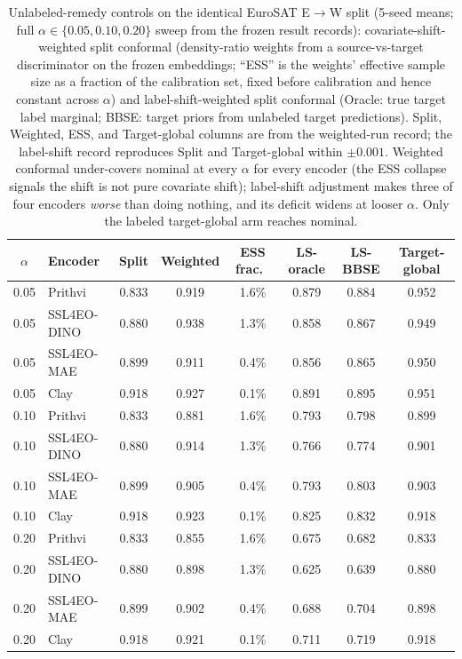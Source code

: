 \documentclass[journal]{IEEEtran}
\renewcommand{\_}{\textunderscore\allowbreak}
\begin{document}
\begin{table}[htbp]\centering\small
\caption{Unlabeled-remedy controls on the identical EuroSAT E$\to$W split (5-seed means; full
$\alpha\in\{0.05,0.10,0.20\}$ sweep from the frozen result records): covariate-shift-weighted split
conformal (density-ratio weights from a source-vs-target discriminator on
the frozen embeddings; ``ESS'' is the weights' effective sample size as a fraction of the calibration set,
fixed before calibration and hence constant across $\alpha$) and label-shift-weighted split conformal
(Oracle: true target label marginal; BBSE: target
priors from unlabeled target predictions). Split, Weighted, ESS, and Target-global columns are from the
weighted-run record; the label-shift record reproduces Split and Target-global within $\pm0.001$. Weighted
conformal under-covers nominal at every $\alpha$ for every encoder (the ESS collapse signals the shift is
not pure covariate shift); label-shift adjustment makes three of four encoders \emph{worse} than doing
nothing, and its deficit widens at looser $\alpha$. Only the labeled target-global arm reaches
nominal.}\label{tab:weighted}\label{tab:labelshift}
\begin{tabular}{clcccccc}
\toprule
$\alpha$ & Encoder & Split & Weighted & ESS frac.\ & LS-oracle & LS-BBSE & Target-global \\
\midrule
0.05 & Prithvi     & 0.833 & 0.919 & 1.6\% & 0.879 & 0.884 & 0.952 \\
0.05 & SSL4EO-DINO & 0.880 & 0.938 & 1.3\% & 0.858 & 0.867 & 0.949 \\
0.05 & SSL4EO-MAE  & 0.899 & 0.911 & 0.4\% & 0.856 & 0.865 & 0.950 \\
0.05 & Clay        & 0.918 & 0.927 & 0.1\% & 0.891 & 0.895 & 0.951 \\
\midrule
0.10 & Prithvi     & 0.833 & 0.881 & 1.6\% & 0.793 & 0.798 & 0.899 \\
0.10 & SSL4EO-DINO & 0.880 & 0.914 & 1.3\% & 0.766 & 0.774 & 0.901 \\
0.10 & SSL4EO-MAE  & 0.899 & 0.905 & 0.4\% & 0.793 & 0.803 & 0.903 \\
0.10 & Clay        & 0.918 & 0.923 & 0.1\% & 0.825 & 0.832 & 0.918 \\
\midrule
0.20 & Prithvi     & 0.833 & 0.855 & 1.6\% & 0.675 & 0.682 & 0.833 \\
0.20 & SSL4EO-DINO & 0.880 & 0.898 & 1.3\% & 0.625 & 0.639 & 0.880 \\
0.20 & SSL4EO-MAE  & 0.899 & 0.902 & 0.4\% & 0.688 & 0.704 & 0.898 \\
0.20 & Clay        & 0.918 & 0.921 & 0.1\% & 0.711 & 0.719 & 0.918 \\
\bottomrule
\end{tabular}
\end{table}
\end{document}
